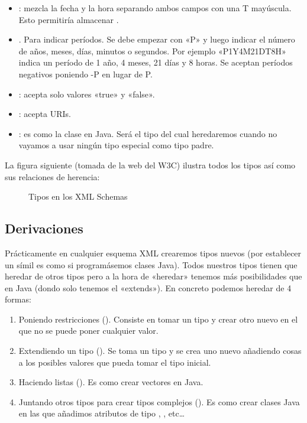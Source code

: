 \documentclass[letterpaper,10pt,spanish]{sphinxmanual}
\begin{document}
\begin{itemize}
\item {} 
: mezcla la fecha y la hora separando ambos campos con una T mayúscula. Esto permitiría almacenar .

\item {} 
. Para indicar períodos. Se debe empezar con «P» y luego indicar el número de años, meses, días, minutos o segundos. Por ejemplo «P1Y4M21DT8H» indica un período de 1 año, 4 meses, 21 días y 8 horas. Se aceptan períodos negativos poniendo -P en lugar de P.

\item {} 
: acepta solo valores «true» y «false».

\item {} 
: acepta URIs.

\item {} 
: es como la clase  en Java. Será el tipo del cual heredaremos cuando no vayamos a usar ningún tipo especial como tipo padre.

\end{itemize}

La figura siguiente (tomada de la web del W3C) ilustra todos los tipos así como sus relaciones de herencia:

\begin{figure}[htbp]
\centering
\capstart

\noindent{}
\caption{Tipos en los XML Schemas}\label{\detokenize{tema5:id5}}\end{figure}


\subsection{Derivaciones}
\label{\detokenize{tema5:derivaciones}}
Prácticamente en cualquier esquema XML crearemos tipos nuevos (por establecer un símil es como si programásemos clases Java). Todos nuestros tipos tienen que heredar de otros tipos pero a la hora de «heredar» tenemos más posibilidades que en Java (dondo solo tenemos el «extends»). En concreto podemos heredar de 4 formas:
\begin{enumerate}
\item {} 
Poniendo restricciones (). Consiste en tomar un tipo y crear otro nuevo en el que no se puede poner cualquier valor.

\item {} 
Extendiendo un tipo (). Se toma un tipo y se crea uno nuevo añadiendo cosas a los posibles valores que pueda tomar el tipo inicial.

\item {} 
Haciendo listas (). Es como crear vectores en Java.

\item {} 
Juntando otros tipos para crear tipos complejos (). Es como crear clases Java en las que añadimos atributos de tipo , , etc…

\end{enumerate}
\end{document}
